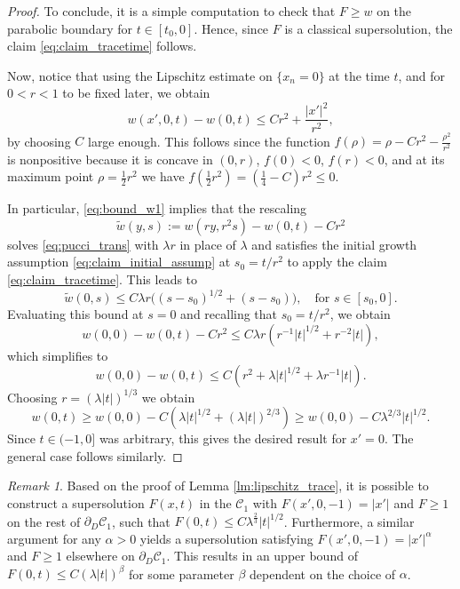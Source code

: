 \documentclass[12pt]{article}
\numberwithin{Theorem}{section}
\theoremstyle{definition}
\theoremstyle{remark}
\newtheorem{Remark}[Theorem]{Remark}
\numberwithin{equation}{section}
\begin{document}
\begin{proof}
    To conclude, it is a simple computation to check that $F\geq w$ on the parabolic boundary for $t \in [t_0, 0]$. Hence, since $F$ is a classical supersolution, the claim \eqref{eq:claim_tracetime} follows.

    Now, notice that using the Lipschitz estimate on $\{x_n=0 \}$ at the time $t$, and for $0<r<1$ to be fixed later, we obtain
    \begin{equation} \label{eq:bound_w1}
        w(x',0,t) - w(0,t) \leq Cr^2 + \frac{|x'|^2}{r^2},
    \end{equation}
    by choosing $C$ large enough.
    This follows since the function $f(\rho)=\rho - Cr^2-\frac{\rho^2}{r^2}$ is nonpositive because it is concave in $(0,r)$, $f(0) < 0$, $f(r) <0$, and at its maximum point $\rho=\frac{1}{2}r^2$ we have $f\left(\frac{1}{2}r^2\right)=\left(\frac{1}{4}-C\right)r^2 \leq 0.$
    
    In particular, \eqref{eq:bound_w1} implies that the rescaling 
    \[
    \tilde w(y,s):=w(ry,r^2 s)-w(0,t)-Cr^2
    \]
    solves \eqref{eq:pucci_trans} with $\lambda r$ in place of $
\lambda$ and satisfies the initial growth assumption \eqref{eq:claim_initial_assump} at $s_0=t/r^2$  to apply the claim \eqref{eq:claim_tracetime}. This leads to
    $$
    \tilde w(0,s) \leq C\lambda r \big((s - s_0)^{1/2} + (s - s_0)\big), \quad \text{for } s \in [s_0, 0].
    $$
    Evaluating  this bound at $s=0$ and recalling that $s_0=t/r^2$, we obtain
    \[
  w(0,0)-w(0,t) - Cr^2 \leq C\lambda r \left( r^{-1}|t|^{1/2} + r^{-2}|t| \right),
    \]
    which simplifies to
    \[
   w(0,0)-w(0,t) \leq C(r^2+\lambda |t|^{1/2}+\lambda r^{-1} |t|).
    \]
    Choosing $r=\left( \lambda |t|\right)^{1/3}$ we obtain
    \[
    w(0,t) \geq w(0,0) - C\left( \lambda|t|^{1/2} + \left( \lambda |t|\right)^{2/3} \right) \geq w(0,0) - C \lambda^{2/3} |t|^{1/2}.
    \]
    Since $t \in (-1,0]$ was arbitrary, this gives the desired result for $x'=0$. The general case follows similarly.
\end{proof}

\begin{Remark}
    Based on the proof of Lemma \ref{lm:lipschitz_trace}, it is possible to construct a supersolution $F(x, t)$ in the $\mathcal{C}_1$ with $F(x',0, -1) = |x'|$ and $F \ge 1$ on the rest of $\partial_D \mathcal{C}_1$, such that $F(0, t) \le C \lambda^{\frac{2}{3}} |t|^{1/2}$. Furthermore, a similar argument for any ${ \alpha} > 0$ yields a supersolution satisfying $F(x', 0, -1) = |x'|^{{ \alpha}}$ and $F \ge 1$ elsewhere on $\partial_D \mathcal{C}_1$. This results in an upper bound of $F(0, t) \le C(\lambda |t|)^{\beta}$ for some parameter $\beta$ dependent on the choice of ${ \alpha}$.
\end{Remark}
\end{document}
